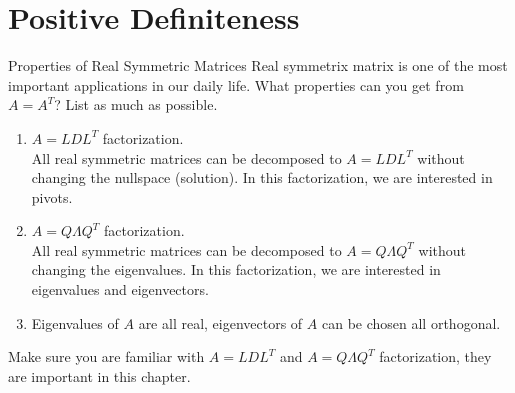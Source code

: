 \documentclass{beamer}
\begin{document}
\section{Positive Definiteness}
\begin{frame}{Properties of Real Symmetric Matrices}
Real symmetrix matrix is one of the most important applications in our daily life. What properties can you get from $A=A^T$? List as much as possible.

\begin{enumerate}
    \item $A=LDL^T$ factorization.\\
    All real symmetric matrices can be decomposed to $A=LDL^T$ without changing the nullspace (solution). In this factorization, we are interested in pivots.
    \item $A=Q\varLambda Q^T$ factorization.\\
    All real symmetric matrices can be decomposed to $A=Q\varLambda Q^T$ without changing the eigenvalues. In this factorization, we are interested in eigenvalues and eigenvectors.
    \item Eigenvalues of $A$ are all real, eigenvectors of $A$ can be chosen all orthogonal.
\end{enumerate}

Make sure you are familiar with $A=LDL^T$ and $A=Q\varLambda Q^T$ factorization, they are important in this chapter.
\end{frame}
\end{document}
